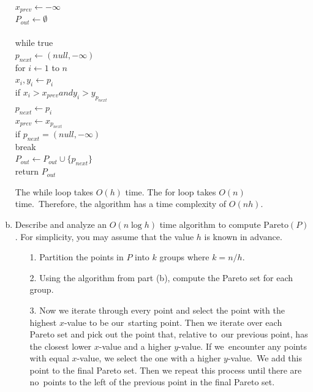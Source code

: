 \documentclass[11pt]{article}
\begin{document}
\begin{enumerate}[(a)]
\begin{solution}
  \begin{algo}
    \+
    \\  \(x_{prev} \gets -\infty\)
    \\  \(P_{out} \gets \emptyset\)
    \\
    \\  while true\+
    \\    \(p_{next} \gets (null,-\infty)\)
    \\    for \(i \gets 1\) to \(n\)\+
    \\      \(x_i, y_i \gets p_i\)
    \\      if \(x_i > x_{prev} and y_i > y_{p_{next}}\)\+
    \\        \(p_{next} \gets p_i\)\-\-
    \\    \(x_{prev} \gets x_{p_{next}}\)
    \\    if \(p_{next} = (null,-\infty)\)\+
    \\      break\-
    \\    \(P_{out} \gets P_{out} \cup \{p_{next}\}\)\-
    \\  return \(P_{out}\)
  \end{algo}

  The while loop takes \(O(h)\) time. The for loop takes \(O(n)\) time.\
  Therefore, the algorithm has a time complexity of \(O(nh)\).
\end{solution}

  \item
    Describe and analyze an \(O(n \log h)\) time algorithm to compute \(\text{Pareto}(P)\).
    For simplicity, you may assume that the value \(h\) is known in advance.

\begin{solution}
  \begin{enumerate}
    \item[1.]
      Partition the points in \(P\) into \(k\) groups where \(k=n/h\).\
    \item[2.]
      Using the algorithm from part (b), compute the Pareto set for each group.
    \item[3.]
      Now we iterate through every point and select the point with the highest \(x\)-value to be our\
      starting point. Then we iterate over each Pareto set and pick out the point that, relative to\
      our previous point, has the closest lower \(x\)-value and a higher \(y\)-value. If we\
      encounter any points with equal \(x\)-value, we select the one with a higher \(y\)-value.\
      We add this point to the final Pareto set. Then we repeat this process until there are no\
      points to the left of the previous point in the final Pareto set.
  \end{enumerate}


\end{solution}
\end{enumerate}
\end{document}
